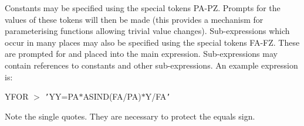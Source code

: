 {{{         Constants may be specified using the special tokens PA-PZ.
         Prompts for the values of these tokens will then be made (this
         provides a mechanism for parameterising functions allowing
         trivial value changes). Sub-expressions which occur in many
         places may also be specified using the special tokens FA-FZ.
         These are prompted for and placed into the main expression.
         Sub-expressions may contain references to constants and other
         sub-expressions. An example expression is:
         \begin{description}
            \item YFOR $>$ {\tt '}YY=PA$*$ASIND(FA/PA)$*$Y/FA{\tt '}
         \end{description}
         Note the single quotes. They are necessary to protect the
         equals sign.
      }
      }}
